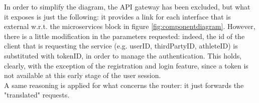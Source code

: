 In order to simplify the diagram, the API gateway has been excluded, but what it exposes is just the following: it provides a link for each
interface that is external w.r.t. the microservices block in figure \ref{fig:componentdiagram}. However, there is a little modification in the
parameters requested: indeed, the id of the client that is requesting the service (e.g. userID, thirdPartyID, athleteID) is substituted with
tokenID, in order to manage the authentication. This holds, clearly, with the exception of the registration and login feature, since a token 
is not available at this early stage of the user session. \\ 
A same reasoning is applied for what concerns the router: it just forwards the "translated" requests.